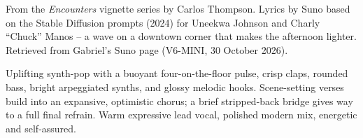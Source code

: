 
\label{sec:a-little-more-welcome}
\begin{notes}
From the \emph{Encounters} vignette series by Carlos Thompson. Lyrics by Suno based on the Stable Diffusion prompts (2024) for Uneekwa Johnson and Charly ``Chuck'' Manos -- a wave on a downtown corner that makes the afternoon lighter. Retrieved from Gabriel's Suno page (V6-MINI, 30 October 2026).
\end{notes}
\begin{style}
Uplifting synth-pop with a buoyant four-on-the-floor pulse, crisp claps, rounded bass, bright arpeggiated synths, and glossy melodic hooks. Scene-setting verses build into an expansive, optimistic chorus; a brief stripped-back bridge gives way to a full final refrain. Warm expressive lead vocal, polished modern mix, energetic and self-assured.
\end{style}
